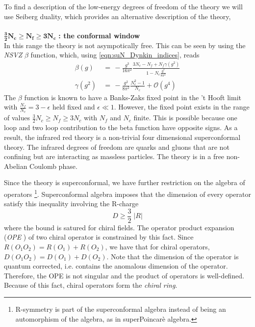 To find a description of the low-energy degrees of freedom of the theory we will use Seiberg duality, which provides an alternative description of the theory,
\\
\\
$\mathbf{  \frac{3}{2} N_c \geq N_f \geq  3 N_c}$ \textbf{: the conformal window}\\
In this range the theory is not asympotically free. This can be seen by using the \emph{NSVZ} $\beta$ function, which, using \eqref{eqn:suN_Dynkin_indices}, reads
\begin{align}
 \beta (g) & \, = \,- \frac{g^3}{16 \pi^2} \frac{3 N_c - N_f + N_f \gamma(g^2)}{1 - N_c \frac{g^2}{8 \pi^2}} \\
\gamma(g^2) &  \,= \, - \frac{g^2}{8 \pi^2} \frac{N_c^2 - 1}{N_c} + \mathcal{O} (g^4)
\end{align} 
The $\beta$ function is known to have a Banks-Zaks fixed point \cite{Banks:1981nn} in the 't Hooft limit with $\frac{N_f}{N_c} = 3 - \epsilon$ held fixed and $\epsilon \ll 1$.
However, the fixed point exists in the range of values $\frac{3}{2} N_c \geq N_f \geq  3 N_c$ with $N_f$ and $N_c$ finite.
This is possible because one loop and two loop contribution to the beta function have opposite signs.
As a result, the infrared red theory is a non-trivial four dimensional superconformal theory. 
The infrared degrees of freedom are quarks and gluons that are not confining but are interacting as massless particles.
The theory is in a free non-Abelian Coulomb phase.

Since the theory is superconformal, we have further restriction on the algebra of operators \footnote{
	R-symmetry is part of the superconformal algebra instead of being an automorphism of the algebra, as in superPoincarè algebra.  
	}.
Superconformal algebra imposes that the dimension of every operator satisfy this inequality involving the R-charge
\begin{equation}
 D \geq \frac{3}{2} \; | R |
 \label{eqn:superconformal_dimension_rcharge}
\end{equation}
where the bound is satured for chiral fields.
The operator product expansion (\emph{OPE} ) of two chiral operator is constrained by this fact.
Since $R( O_1 O_2) = R(O_1) + R(O_2)$, we have that for chiral operators, $D(O_1 O_2) = D(O_1) + D(O_2)$. 
Note that the dimension of the operator is quantum corrected, i.e. contains the anomalous dimension of the operator.
Therefore, the OPE is not singular and the product of operators is well-defined. Because of this fact, chiral operators form the \emph{chiral ring}. 


